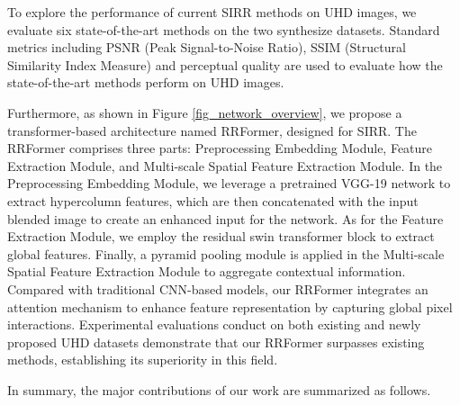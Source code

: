 \documentclass[10pt,journal]{IEEEtran}
\begin{document}
To explore the performance of current SIRR methods on UHD images, we evaluate six state-of-the-art methods on the two synthesize datasets. Standard metrics including PSNR (Peak Signal-to-Noise Ratio), SSIM (Structural Similarity Index Measure) \cite{wangImageQualityAssessment2004} and perceptual quality are used to evaluate how the state-of-the-art methods perform on UHD images.


Furthermore, as shown in Figure \ref{fig_network_overview}, we propose a transformer-based architecture named RRFormer, designed for SIRR. The RRFormer comprises three parts: Preprocessing Embedding Module, Feature Extraction Module, and Multi-scale Spatial Feature Extraction Module. In the Preprocessing Embedding Module, we leverage a pretrained VGG-19 network to extract hypercolumn features, which are then concatenated with the input blended image to create an enhanced input for the network. 
As for the Feature Extraction Module, we employ the residual swin transformer block \cite{liangSwinirImageRestoration2021} to extract global features. 
Finally, a pyramid pooling module \cite{heSpatialPyramidPooling2015,zhaoPyramidSceneParsing2017} is applied in the Multi-scale Spatial Feature Extraction Module to aggregate contextual information. 
Compared with traditional CNN-based models, our RRFormer integrates an attention mechanism to enhance feature representation by capturing global pixel interactions. Experimental evaluations conduct on both existing and newly proposed UHD datasets demonstrate that our RRFormer surpasses existing methods, establishing its superiority in this field.

In summary, the major contributions of our work are summarized as follows.
\end{document}
